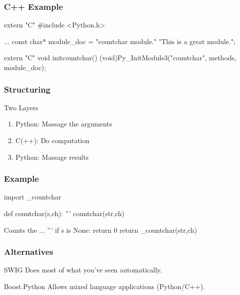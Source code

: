 \begin{frame}[fragile]
\frametitle{C++ Example}
\begin{ccode}

extern "C" {
    #include <Python.h>
}

...
const char* module_doc = 
    "countchar module.\n\n"
    "This is a great module.\n";

extern "C"
void initcountchar()
  {
    (void)Py_InitModule3("countchar", methods, module_doc);
  }
\end{ccode}
\end{frame}

\begin{frame}[fragile]
\frametitle{Structuring}

\begin{block}{Two Layers}
\begin{enumerate}
\item \alert{Python}: Massage the arguments
\item \alert{C(++)}: Do computation
\item \alert{Python}: Massage results
\end{enumerate}
\end{block}
\end{frame}

\begin{frame}[fragile]
\frametitle{Example}

\begin{python}
import _countchar

def countchar(s,ch):
    '''
    countchar(str,ch)

    Counts the ...
    '''
    if s is None:
        return 0
    return _countchar(str,ch)
\end{python}
\end{frame}

\begin{frame}[fragile]
\frametitle{Alternatives}

\begin{block}{SWIG}
Does most of what you've seen automatically.
\end{block}

\begin{block}{Boost.Python}
Allows mixed language applications (Python/C++).
\end{block}

\end{frame}

